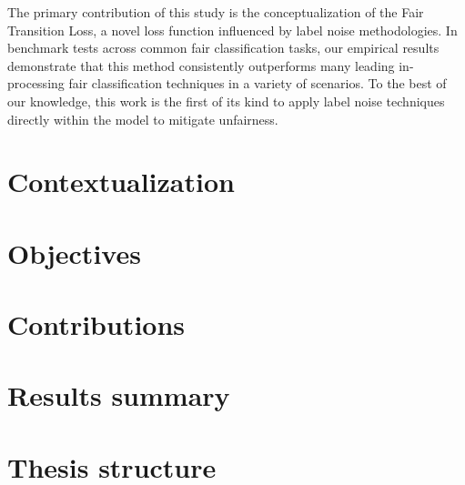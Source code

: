The primary contribution of this study is the conceptualization of the Fair Transition Loss, a novel loss function influenced by label noise methodologies. In benchmark tests across common fair classification tasks, our empirical results demonstrate that this method consistently outperforms many leading in-processing fair classification techniques in a variety of scenarios. To the best of our knowledge, this work is the first of its kind to apply label noise techniques directly within the model to mitigate unfairness. 



\section{Contextualization}

\section{Objectives}

\section{Contributions}

\section{Results summary}

\section{Thesis structure}
